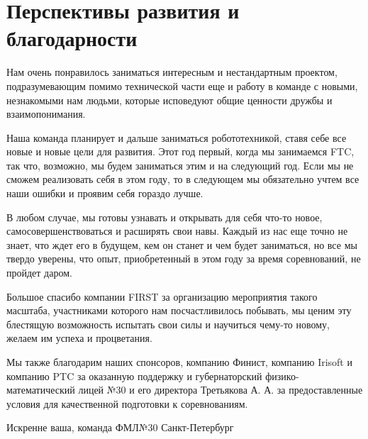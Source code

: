 
\section{Перспективы развития и благодарности}
    Нам очень понравилось заниматься интересным и нестандартным проектом, подразумевающим помимо технической части еще и работу в команде с новыми, незнакомыми нам людьми, которые исповедуют общие ценности дружбы и взаимопонимания.
    
    Наша команда планирует и дальше заниматься робототехникой, ставя себе все новые и новые цели для развития. Этот год первый, когда мы занимаемся FTC, так что, возможно, мы будем заниматься этим и на следующий год. Если мы не сможем реализовать себя в этом году, то в следующем мы обязательно учтем все наши ошибки и проявим себя гораздо лучше.
    
    В любом случае, мы готовы узнавать и открывать для себя что-то новое, самосовершенствоваться и расширять свои навы.
     Каждый из нас еще точно не знает, что ждет его в будущем, кем он станет и чем будет заниматься, но все мы твердо уверены, что опыт, приобретенный в этом году за время соревнований, не пройдет даром.
    
    Большое спасибо компании FIRST за организацию мероприятия такого масштаба, участниками которого нам посчастливилось побывать, мы ценим эту блестящую возможность испытать свои силы и научиться чему-то новому, желаем им успеха и процветания.
    
    Мы также благодарим наших спонсоров, компанию Финист, компанию Irisoft и компанию PTC за оказанную поддержку и губернаторский физико-математический лицей №30 и его директора Третьякова А. А. за предоставленные условия для качественной подготовки к соревнованиям.
    
    \begin{center}
      Искренне ваша, команда ФМЛ№30 Санкт-Петербург
    \end{center}
    
    \vspace{0.5em}
    
